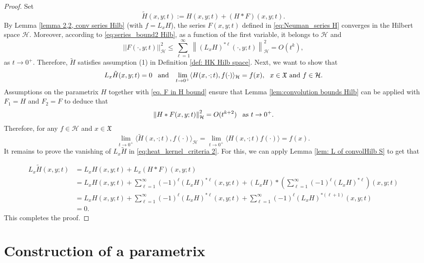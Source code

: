 \documentclass[11pt,reqno]{amsart}
\theoremstyle{remark}
\theoremstyle{definition}
\numberwithin{theorem}{section} \numberwithin{equation}{section}
\newcommand{\Hil}{\mathcal{H}}
\newcommand{\X}{\mathfrak{X}}
\begin{document}
\begin{proof}
Set
$$
\tilde{H}(x,y;t) := H(x,y;t)+(H\ast F)(x,y;t).
$$
By Lemma \ref{lemma 2,2, conv series Hilb} (with $f=L_xH$), the series $F(x,y;t)$ defined in \eqref{eq:Neuman_series H}
converges in the Hilbert space $\mathcal{H}$. Moreover, according to \eqref{eq:series_bound2 Hilb}, as a function of the first variable, it belongs to $\mathcal{H}$ and
\begin{equation}\label{eq. F in H bound}
||F(\cdot,y;t)||_\mathcal{H}^2\leq \sum_{\ell=1}^\infty \left\|(L_xH)^{\ast \ell}(\cdot,y;t)\right\|_\mathcal{H}^2=  O(t^{k}),
\end{equation}
as $t \rightarrow 0^+$. Therefore, $\tilde{H}$ satisfies assumption (1) in Definition \ref{def: HK Hilb space}. Next, we want to show that
\begin{equation}\label{eq:heat_kernel_criteria 2}
L_{x}\tilde{H}(x,y;t)=0
\,\,\,\,\,
\text{\rm and}
\,\,\,\,\,
 \lim_{t\to 0^+}\langle H (x,\cdot;t),f(\cdot)\rangle_\Hil =f(x),
\,\,\,\,
\text{\rm $x\in\X$ and $f\in \mathcal{H}$.}
\end{equation}
Assumptions on the parametrix $H$ together with \eqref{eq. F in H bound} ensure that  Lemma \ref{lem:convolution bounds Hilb} can be applied with $F_1=H$ and $F_2=F$ to deduce that
$$
\left\|H\ast F(x,y;t)\right\|_\mathcal{H}^2= O(t^{k+2})
\,\,\,\,\,
\text{\rm as $t \rightarrow 0^+$.}
$$
Therefore, for any $f\in\mathcal{H}$ and $x\in\X$
$$
 \lim_{t\to 0^+}\langle \tilde H (x,\cdot;t),f(\cdot)\rangle_\Hil =\lim_{t\to 0^+}\langle  H (x,\cdot;t)f(\cdot)\rangle =f(x).
$$
It remains to prove the vanishing of $L_{x}\tilde{H}$ in \eqref{eq:heat_kernel_criteria 2}.
For this, we can apply Lemma \ref{lem: L of convolHilb S} to get that

\begin{align*}
L_{x}\tilde{H}(x,y;t)&=
L_{x}H(x,y;t)+L_{x}(H\ast F)(x,y;t)
\\&=
L_{x}H(x,y;t)+\sum_{\ell=1}^{\infty}(-1)^{\ell}(L_{x}
{H})^{\ast\ell}(x,y;t)+(L_{x}{H})*\left(\sum_{\ell=1}^{\infty}(-1)^{\ell}(L_{x}{H})^{\ast\ell}\right)(x,y;t)\\&=
L_{x}H(x,y;t)+\sum_{\ell=1}^{\infty}(-1)^{\ell}(L_{x}
{H})^{\ast\ell}(x,y;t)+\sum_{\ell=1}^{\infty}(-1)^{\ell}(L_{x}{H})^{\ast(\ell+1)}(x,y;t)\\&
=0.
\end{align*}
This completes the proof.
\end{proof}

\section{Construction of a parametrix}
\end{document}
